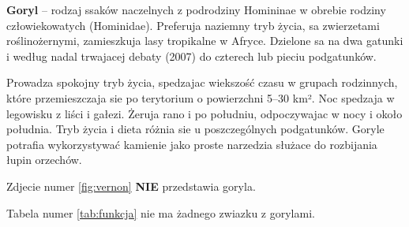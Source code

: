 \begin{center}
    \textbf{Goryl} – rodzaj ssaków naczelnych z podrodziny Homininae w obrebie rodziny człowiekowatych (Hominidae). Preferuja naziemny tryb życia, sa zwierzetami roślinożernymi, zamieszkuja lasy tropikalne w Afryce. Dzielone sa na dwa gatunki i według nadal trwajacej debaty (2007) do czterech lub pieciu podgatunków.\par
\end{center}
\begin{flushleft}
    Prowadza spokojny tryb życia, spedzajac wiekszość czasu w grupach rodzinnych, które przemieszczaja sie po terytorium o powierzchni 5–30 km². Noc spedzaja w legowisku z liści i gałezi. Żeruja rano i po południu, odpoczywajac w nocy i około południa. Tryb życia i dieta różnia sie u poszczególnych podgatunków. Goryle potrafia wykorzystywać kamienie jako proste narzedzia służace do rozbijania łupin orzechów.
\end{flushleft}
\begin{flushright}
    Zdjecie numer \ref{fig:vernon} \textbf{NIE} przedstawia goryla.\par
    Tabela numer \ref{tab:funkcja} nie ma żadnego 
    zwiazku z gorylami.
\end{flushright}



